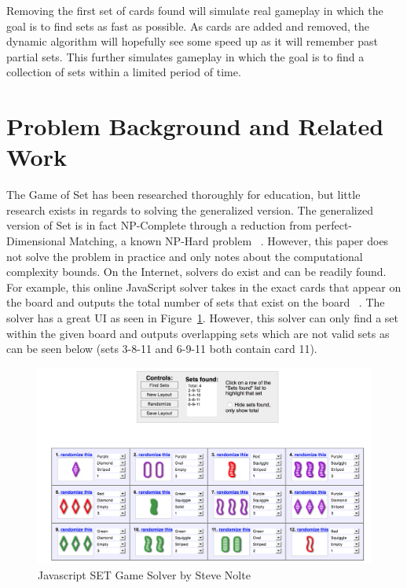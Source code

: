 \documentclass[pageno]{jpaper}
\begin{document}
Removing the first set of cards found will simulate real gameplay in which the goal is to find sets as fast as possible. As cards are added and removed, the dynamic algorithm will hopefully see some speed up as it will remember past partial sets. This further simulates gameplay in which the goal is to find a collection of sets within a limited period of time.


\section{Problem Background and Related Work}


The Game of Set has been researched thoroughly for education, but little research exists in regards to solving the generalized version. The generalized version of Set is in fact NP-Complete through a reduction from perfect-Dimensional Matching, a known NP-Hard problem ~\cite{chaudhuri}. However, this paper does not solve the problem in practice and only notes about the computational complexity bounds. On the Internet, solvers do exist and can be readily found. For example, this online JavaScript solver takes in the exact cards that appear on the board and outputs the total number of sets that exist on the board ~\cite{nolte}. The solver has a great UI as seen in Figure~\ref{fig:nolteUI}. However, this solver can only find a set within the given board and outputs overlapping sets which are not valid sets as can be seen below (sets 3-8-11 and 6-9-11 both contain card 11). 

\begin{figure}[htbb]
\centering
\begin{minipage}[b]{.75\linewidth}
\includegraphics[width=\linewidth]{nolte.png}
\caption{Javascript SET Game Solver by Steve Nolte}
\label{fig:nolteUI}
\end{minipage}
\end{figure}
\end{document}
